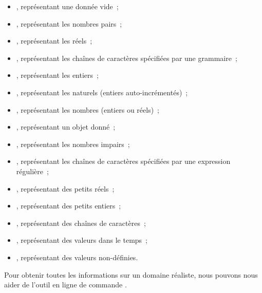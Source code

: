 \begin{itemize}
\item {}, représentant une donnée vide~;

\item {}, représentant les nombres pairs~;

\item {}, représentant les réels~;

\item {}, représentant les chaînes de caractères spécifiées par une
grammaire~;

\item {}, représentant les entiers~;

\item {}, représentant les naturels (entiers auto-incrémentés)~;

\item {}, représentant les nombres (entiers ou réels)~;

\item {}, représentant un objet donné~;

\item {}, représentant les nombres impairs~;

\item {}, représentant les chaînes de caractères spécifiées par une
expression régulière~;

\item {}, représentant des petits réels~;

\item {}, représentant des petits entiers~;

\item {}, représentant des chaînes de caractères~;

\item {}, représentant des valeurs dans le temps~;

\item {}, représentant des valeurs non-définies.

\end{itemize}

Pour obtenir toutes les informations sur un domaine réaliste, nous pouvons nous
aider de l'outil en ligne de commande .

